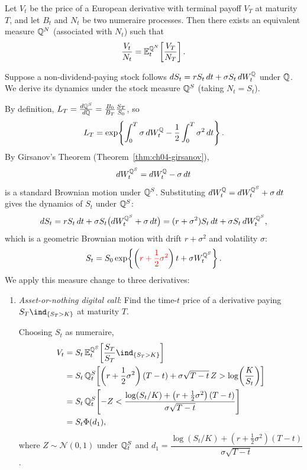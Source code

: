 \begin{theorem}
    \label{thm:ch04-numeraire-2}
    Let $V_t$ be the price of a European derivative with terminal payoff $V_T$ at maturity $T$, and let $B_t$ and $N_t$ be two numeraire processes. Then there exists an equivalent measure $\mathbb{Q}^N$ (associated with $N_t$) such that
    \[
        \frac{V_t}{N_t} = \mathbb{E}_t^{\mathbb{Q}^N}\!\left[\frac{V_T}{N_T}\right].
    \]
\end{theorem}

\begin{example}
    \label{ex:ch04-stock-numeraire}
    Suppose a non-dividend-paying stock follows $dS_t = r S_t\,dt + \sigma S_t\,dW_t^{\mathbb{Q}}$ under $\mathbb{Q}$. We derive its dynamics under the stock measure $\mathbb{Q}^S$ (taking $N_t = S_t$).

    By definition, $L_T = \frac{d\mathbb{Q}^S}{d\mathbb{Q}} = \frac{B_0}{B_T}\frac{S_T}{S_0}$, so
    \[
        L_T = \exp\!\left\{\int_0^T \sigma\,dW_t^{\mathbb{Q}} - \frac{1}{2}\int_0^T \sigma^2\,dt\right\}.
    \]
    By Girsanov's Theorem (Theorem~\ref{thm:ch04-girsanov}),
    \[
        dW_t^{\mathbb{Q}^S} = dW_t^{\mathbb{Q}} - \sigma\,dt
    \]
    is a standard Brownian motion under $\mathbb{Q}^S$. Substituting $dW_t^{\mathbb{Q}} = dW_t^{\mathbb{Q}^S} + \sigma\,dt$ gives the dynamics of $S_t$ under $\mathbb{Q}^S$:
    \[
        dS_t = r S_t\,dt + \sigma S_t\bigl(dW_t^{\mathbb{Q}^S} + \sigma\,dt\bigr)
        = (r + \sigma^2) S_t\,dt + \sigma S_t\,dW_t^{\mathbb{Q}^S},
    \]
    which is a geometric Brownian motion with drift $r + \sigma^2$ and volatility $\sigma$:
    \[
        S_t = S_0 \exp\!\left\{\left(\textcolor{red}{r + \frac{1}{2}\sigma^2}\right)t + \sigma W_t^{\mathbb{Q}^S}\right\}.
    \]
    We apply this measure change to three derivatives:
    \begin{enumerate}
        \item \emph{Asset-or-nothing digital call}: Find the time-$t$ price of a derivative paying $S_T \ind_{\{S_T > K\}}$ at maturity $T$.

        Choosing $S_t$ as numeraire,
        \begin{align*}
            V_t &= S_t\,\E_t^{\Q^S}\!\left[\frac{S_T}{S_T}\ind_{\{S_T > K\}}\right] \\
            &= S_t\,\Q_t^S\!\left[\left(r + \frac{1}{2}\sigma^2\right)(T - t) + \sigma\sqrt{T - t}\,Z > \log\!\left(\frac{K}{S_t}\right)\right] \\
            &= S_t\,\Q_t^S\!\left[-Z < \frac{\log(S_t / K) + \left(r + \frac{1}{2}\sigma^2\right)(T - t)}{\sigma\sqrt{T - t}}\right] \\
            &= S_t \Phi(d_1),
        \end{align*}
        where $Z \sim \mathcal{N}(0, 1)$ under $\mathbb{Q}_t^S$ and $d_1 = \dfrac{\log(S_t / K) + \left(r + \frac{1}{2}\sigma^2\right)(T - t)}{\sigma\sqrt{T - t}}$.


\end{enumerate}
\end{example}
